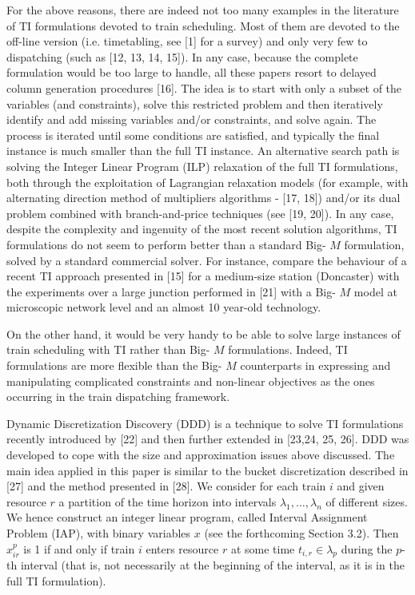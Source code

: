 \documentclass[10pt]{article}
\begin{document}
For the above reasons, there are indeed not too many examples in the literature of TI formulations devoted to train scheduling. Most of them are devoted to the off-line version (i.e. timetabling, see [1] for a survey) and only very few to dispatching (such as [12, 13, 14, 15]). In any case, because the complete formulation would be too large to handle, all these papers resort to delayed column generation procedures [16]. The idea is to start with only a subset of the variables (and constraints), solve this restricted problem and then iteratively identify and add missing variables and/or constraints, and solve again. The process is iterated until some conditions are satisfied, and typically the final instance is much smaller than the full TI instance. An alternative search path is solving the Integer Linear Program (ILP) relaxation of the full TI formulations, both through the exploitation of Lagrangian relaxation models (for example, with alternating direction method of multipliers algorithms - [17, 18]) and/or its dual problem combined with branch-and-price techniques (see [19, 20]). In any case, despite the complexity and ingenuity of the most recent solution algorithms, TI formulations do not seem to perform better than a standard Big- $M$ formulation, solved by a standard commercial solver. For instance, compare the behaviour of a recent TI approach presented in [15] for a medium-size station (Doncaster) with the experiments over a large junction performed in [21] with a Big- $M$ model at microscopic network level and an almost 10 year-old technology.

On the other hand, it would be very handy to be able to solve large instances of train scheduling with TI rather than Big- $M$ formulations. Indeed, TI formulations are more flexible than the Big- $M$ counterparts in expressing and manipulating complicated constraints and non-linear objectives as the ones occurring in the train dispatching framework.

Dynamic Discretization Discovery (DDD) is a technique to solve TI formulations recently introduced by [22] and then further extended in [23,24, 25, 26]. DDD was developed to cope with the size and approximation issues above discussed. The main idea applied in this paper is similar to the bucket discretization described in [27] and the method presented in [28]. We consider for each train $i$ and given resource $r$ a partition of the time horizon into intervals $\lambda_{1}, \ldots, \lambda_{n}$ of different sizes. We hence construct an integer linear program, called Interval Assignment Problem (IAP), with binary variables $x$ (see the forthcoming Section 3.2). Then $x_{i r}^{p}$ is 1 if and only if train $i$ enters resource $r$ at some time $t_{i, r} \in \lambda_{p}$ during the $p$-th interval (that is, not necessarily at the beginning of the interval, as it is in the full TI formulation).
\end{document}
